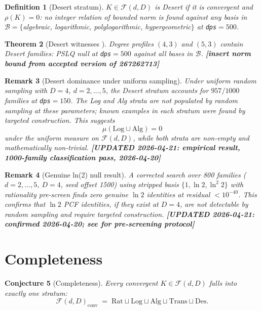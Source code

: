 \documentclass[12pt]{amsart}
\newcommand{\PLACEHOLDER}[1]{{\color{red}\textbf{[#1]}}}
\newcommand{\UPDATED}[1]{{\color{teal}\textbf{[UPDATED 2026-04-21: #1]}}}
\newtheorem{theorem}{Theorem}[section]
\newtheorem{conjecture}[theorem]{Conjecture}
\newtheorem{definition}[theorem]{Definition}
\newtheorem{remark}[theorem]{Remark}
\begin{document}
\begin{definition}[Desert stratum]
$K\in\mathcal{F}(d,D)$ is Desert if it is
convergent and $\rho(K)=0$: no integer
relation of bounded norm is found against
any basis in
$\mathcal{B}=\{$algebraic, logarithmic,
polylogarithmic, hypergeometric$\}$
at \texttt{dps}$=500$.
\end{definition}

\begin{theorem}[Desert witnesses {\cite{Desert}}]
Degree profiles $(4,3)$ and $(5,3)$ contain
Desert families: PSLQ null at
\texttt{dps}$=500$ against all bases in
$\mathcal{B}$.
\PLACEHOLDER{insert norm bound from accepted
version of 267262713}
\end{theorem}

\begin{remark}[Desert dominance under uniform
  sampling]
\label{rem:desert-dominance}
Under uniform random sampling with $D=4$,
$d=2,\ldots,5$, the Desert stratum accounts
for $957/1000$ families at
\texttt{dps}$=150$.
The Log and Alg strata are not populated by
random sampling at these parameters; known
examples in each stratum were found by
targeted construction.
This suggests
\[
  \mu(\mathrm{Log}\cup\mathrm{Alg})=0
\]
under the uniform measure on
$\mathcal{F}(d,D)$, while both strata are
non-empty and mathematically non-trivial.
\UPDATED{empirical result, 1000-family
classification pass, 2026-04-20}
\end{remark}

\begin{remark}[Genuine ln(2) null result]
A corrected search over 800 families
($d=2,\ldots,5$, $D=4$, seed offset 1500)
using stripped basis $\{1,\ln 2,\ln^2 2\}$
with rationality pre-screen finds zero
genuine $\ln 2$ identities at residual
$<10^{-40}$.
This confirms that $\ln 2$ PCF identities,
if they exist at $D=4$, are not detectable
by random sampling and require targeted
construction.
\UPDATED{confirmed 2026-04-20; see
\cite{Rat} for pre-screening protocol}
\end{remark}

\section{Completeness}
\label{sec:completeness}

\begin{conjecture}[Completeness]
\label{conj:complete}
Every convergent $K\in\mathcal{F}(d,D)$
falls into exactly one stratum:
\[
  \mathcal{F}(d,D)_{\mathrm{conv}}
  \;=\;
  \mathrm{Rat}\sqcup\mathrm{Log}
  \sqcup\mathrm{Alg}\sqcup\mathrm{Trans}
  \sqcup\mathrm{Des}.
\]
\end{conjecture}
\end{document}
